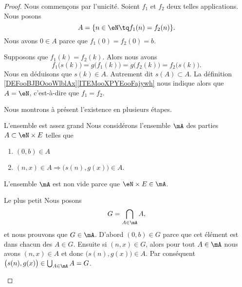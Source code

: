 \begin{proof}
	Nous commençons par l'unicité. Soient \( f_1\) et \( f_2\) deux telles applications. Nous posons
	\begin{equation}
		A=\{ n\in \eN\tq f_1(n)=f_2(n) \}.
	\end{equation}
	Nous avons \( 0\in A\) parce que \( f_1(0)=f_2(0)=b\).

	Supposons que \( f_1(k)=f_2(k)\). Alors nous avons
	\begin{equation}
		f_1\big( s(k) \big)=g\big( f_1(k) \big)=g\big( f_2(k) \big)=f_2\big( s(k) \big).
	\end{equation}
	Nous en déduisons que \( s(k)\in A\). Autrement dit \( s(A)\subset A\). La définition \ref{DEFooBJBOooWlblAx}\ref{ITEMooXPYEooFajywh} nous indique alors que \( A=\eN\), c'est-à-dire que \( f_1=f_2\).

	Nous montrons à présent l'existence en plusieurs étapes.
	\begin{subproof}
		\item[L'ensemble est assez grand]
		Nous considérons l'ensemble \( \mA\) des parties \( A\subset \eN\times E\) telles que
		\begin{enumerate}
			\item
			      \( (0,b)\in A\)
			\item
			      \( (n,x)\in A \Rightarrow \big( s(n),g(x) \big)\in A\).
		\end{enumerate}
		L'ensemble \( \mA\) est non vide parce que \( \eN\times E\in \mA\).
		\item[Le plus petit]
		Nous posons
		\begin{equation}
			G=\bigcap_{A\in \mA}A,
		\end{equation}
		et nous prouvons que \( G\in\mA\). D'abord \( (0,b)\in G\) parce que cet élément est dans chacun des \( A\in G\). Ensuite si \( (n,x)\in G\), alors pour tout \( A\in\mA \) nous avons \( (n,x)\in A\) et donc \( \big( s(n),g(x) \big)\in A\). Par conséquent \( \big( s(n),g(x) \big)\in \bigcup_{A\in\mA}A=G\).


\end{subproof}
\end{proof}
